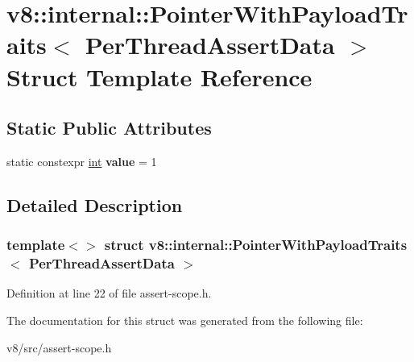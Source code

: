 \hypertarget{structv8_1_1internal_1_1PointerWithPayloadTraits_3_01PerThreadAssertData_01_4}{}\section{v8\+:\+:internal\+:\+:Pointer\+With\+Payload\+Traits$<$ Per\+Thread\+Assert\+Data $>$ Struct Template Reference}
\label{structv8_1_1internal_1_1PointerWithPayloadTraits_3_01PerThreadAssertData_01_4}
\subsection*{Static Public Attributes}
\begin{DoxyCompactItemize}
\item 
\mbox{\label{structv8_1_1internal_1_1PointerWithPayloadTraits_3_01PerThreadAssertData_01_4_a095e07255471069e6a58c577df0dd233}} 
static constexpr \mbox{\hyperlink{classint}{int}} {\bfseries value} = 1
\end{DoxyCompactItemize}


\subsection{Detailed Description}
\subsubsection*{template$<$$>$\newline
struct v8\+::internal\+::\+Pointer\+With\+Payload\+Traits$<$ Per\+Thread\+Assert\+Data $>$}



Definition at line 22 of file assert-\/scope.\+h.



The documentation for this struct was generated from the following file\+:\begin{DoxyCompactItemize}
\item 
v8/src/assert-\/scope.\+h\end{DoxyCompactItemize}
